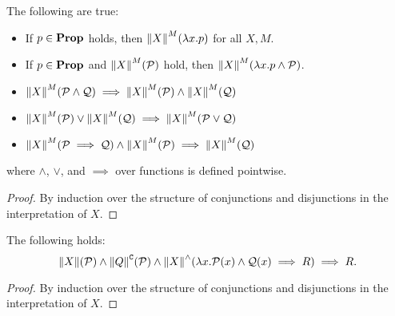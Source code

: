 \begin{lemma}
  \label{algorithmic:interpretation-connectives}
  The following are true:
  \begin{itemize}
    \item If $p \in {\mathbf{Prop}}$ holds, then $\interpG X M {\lam x p}$ for all $X, M$.
    \item If $p \in {\mathbf{Prop}}$ and $\interpGJ X M$ hold, then $\interpG X M {\lam x {p \wedge \mathcal P}}$. 
    \item $\interpG X M {\mathcal P \wedge \mathcal Q} \implies \interpG X M {\mathcal P} \wedge \interpG X M {\mathcal Q}$
    \item $\interpG X M {\mathcal P} \vee \interpG X M {\mathcal Q} \implies \interpG X M {\mathcal P \vee \mathcal Q}$
    \item $\interpG X M {\mathcal P \implies \mathcal Q} \wedge \interpG X M {\mathcal P} \implies \interpG X M {\mathcal Q}$
  \end{itemize}
  where $\wedge$, $\vee$, and $\implies$ over functions is defined pointwise.
\end{lemma}
\begin{proof}
  By induction over the structure of conjunctions and disjunctions in the interpretation of $X$.
\end{proof}


\begin{lemma}
  \label{algorithmic:interpretation-mix}
  The following holds:
  $$ {\interpJ X \wedge \interpCJ Q \wedge
     \interpWedge X {\lam x {\mathcal P {(x)} \wedge \mathcal Q {(x)} \implies R }} }
     \implies R.$$
\end{lemma}
\begin{proof}
  By induction over the structure of conjunctions and disjunctions in the interpretation of $X$.
\end{proof}

